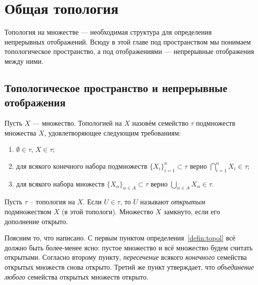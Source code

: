 \section{Общая топология}
Топология на множестве --- необходимая структура для определения непрерывных отображений. Всюду в этой главе под пространством мы понимаем топологическое пространство, а под отображениями --- непрерывные отображения между ними.

\subsection{Топологическое пространство и непрерывные отображения}
\begin{defin}\label{defin:topol}
	Пусть $X$ --- множество. Топологией на $X$ назовём семейство $\tau$ подмножеств множества $X$, удовлетворяющее следующим требованиям:
	\begin{enumerate}
		\item $\emptyset\in\tau$, $X\in\tau$;
		\item для всякого конечного набора подмножеств $\{X_i\}_{i=1}^n\subset\tau$ верно $\bigcap\limits_{i=1}^n X_i\in\tau$;
		\item для всякого набора множеств $\{X_{\alpha}\}_{\alpha\in A}\subset\tau$ верно $\bigcup\limits_{\alpha\in A} X_{\alpha}\in\tau$.
	\end{enumerate}
\end{defin}
\begin{defin}
	Пусть $\tau$ -- топология на $X$. Если $U\in\tau$, то $U$ называют \textit{открытым} подмножеством $X$ (в этой топологи). Множество $X$ замкнуто, если его дополнение открыто.
\end{defin}
Поясним то, что написано. С первым пунктом определения~\ref{defin:topol} всё должно быть более-менее ясно: пустое множество и всё множество будем считать открытыми. Согласно второму пункту, \textit{пересечение} всякого \textit{конечного} семейства открытых множеств снова открыто. Третий же пункт утверждает, что \textit{объединение} \textit{любого} семейства открытых множеств открыто.

